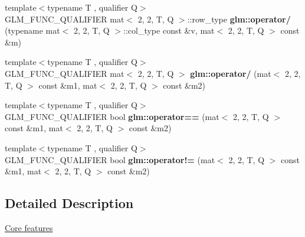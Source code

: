\begin{DoxyCompactItemize}
\item 
\mbox{\label{type__mat2x2_8inl_a4c38c0b03a459b89203c68cebaa2ab79}} 
{\footnotesize template$<$typename T , qualifier Q$>$ }\\G\+L\+M\+\_\+\+F\+U\+N\+C\+\_\+\+Q\+U\+A\+L\+I\+F\+I\+ER mat$<$ 2, 2, T, Q $>$\+::row\+\_\+type {\bfseries glm\+::operator/} (typename mat$<$ 2, 2, T, Q $>$\+::col\+\_\+type const \&v, mat$<$ 2, 2, T, Q $>$ const \&m)
\item 
\mbox{\label{type__mat2x2_8inl_a952a07cc4b69739af33e4531085a9cbf}} 
{\footnotesize template$<$typename T , qualifier Q$>$ }\\G\+L\+M\+\_\+\+F\+U\+N\+C\+\_\+\+Q\+U\+A\+L\+I\+F\+I\+ER mat$<$ 2, 2, T, Q $>$ {\bfseries glm\+::operator/} (mat$<$ 2, 2, T, Q $>$ const \&m1, mat$<$ 2, 2, T, Q $>$ const \&m2)
\item 
\mbox{\label{type__mat2x2_8inl_a82a69bca4c840fba89832e0175eec274}} 
{\footnotesize template$<$typename T , qualifier Q$>$ }\\G\+L\+M\+\_\+\+F\+U\+N\+C\+\_\+\+Q\+U\+A\+L\+I\+F\+I\+ER bool {\bfseries glm\+::operator==} (mat$<$ 2, 2, T, Q $>$ const \&m1, mat$<$ 2, 2, T, Q $>$ const \&m2)
\item 
\mbox{\label{type__mat2x2_8inl_aff8daab6db273abada3e120aedd93499}} 
{\footnotesize template$<$typename T , qualifier Q$>$ }\\G\+L\+M\+\_\+\+F\+U\+N\+C\+\_\+\+Q\+U\+A\+L\+I\+F\+I\+ER bool {\bfseries glm\+::operator!=} (mat$<$ 2, 2, T, Q $>$ const \&m1, mat$<$ 2, 2, T, Q $>$ const \&m2)
\end{DoxyCompactItemize}


\subsection{Detailed Description}
\hyperlink{group__core}{Core features} 